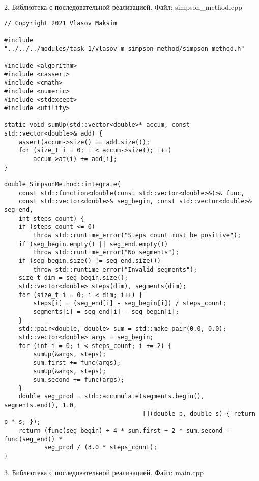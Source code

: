 \documentclass{report}
\begin{document}
\par 2. Библиотека с последовательной реализацией. Файл: simpson\_method.cpp

\begin{lstlisting}
// Copyright 2021 Vlasov Maksim

#include "../../../modules/task_1/vlasov_m_simpson_method/simpson_method.h"

#include <algorithm>
#include <cassert>
#include <cmath>
#include <numeric>
#include <stdexcept>
#include <utility>

static void sumUp(std::vector<double>* accum, const std::vector<double>& add) {
    assert(accum->size() == add.size());
    for (size_t i = 0; i < accum->size(); i++)
        accum->at(i) += add[i];
}

double SimpsonMethod::integrate(
    const std::function<double(const std::vector<double>&)>& func,
    const std::vector<double>& seg_begin, const std::vector<double>& seg_end,
    int steps_count) {
    if (steps_count <= 0)
        throw std::runtime_error("Steps count must be positive");
    if (seg_begin.empty() || seg_end.empty())
        throw std::runtime_error("No segments");
    if (seg_begin.size() != seg_end.size())
        throw std::runtime_error("Invalid segments");
    size_t dim = seg_begin.size();
    std::vector<double> steps(dim), segments(dim);
    for (size_t i = 0; i < dim; i++) {
        steps[i] = (seg_end[i] - seg_begin[i]) / steps_count;
        segments[i] = seg_end[i] - seg_begin[i];
    }
    std::pair<double, double> sum = std::make_pair(0.0, 0.0);
    std::vector<double> args = seg_begin;
    for (int i = 0; i < steps_count; i += 2) {
        sumUp(&args, steps);
        sum.first += func(args);
        sumUp(&args, steps);
        sum.second += func(args);
    }
    double seg_prod = std::accumulate(segments.begin(), segments.end(), 1.0,
                                      [](double p, double s) { return p * s; });
    return (func(seg_begin) + 4 * sum.first + 2 * sum.second - func(seg_end)) *
           seg_prod / (3.0 * steps_count);
}
\end{lstlisting}

\par 3. Библиотека с последовательной реализацией. Файл: main.cpp
\end{document}
